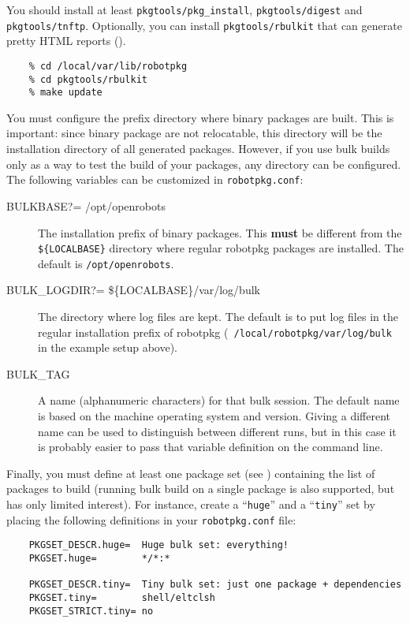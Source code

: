 You should install at least {\tt pkgtools/pkg\_install}, {\tt pkgtools/digest}
and {\tt pkgtools/tnftp}. Optionally, you can install {\tt pkgtools/rbulkit}
that can generate pretty HTML reports
().
\begin{verbatim}
	% cd /local/var/lib/robotpkg
	% cd pkgtools/rbulkit
	% make update
\end{verbatim}

You must configure the prefix  directory where binary packages are built.  This
is important: since binary package  are not relocatable, this directory will be
the installation directory of all  generated packages. However, if you use bulk
builds only as a  way to test the build of your  packages, any directory can be
configured. The following variables can be customized in {\tt robotpkg.conf}:

\begin{description}

   \item[BULKBASE?=	/opt/openrobots]
   The installation prefix of binary packages. This {\bf must} be different
   from the {\tt\$\{LOCALBASE\}} directory where regular robotpkg packages are
   installed. The default is {\tt /opt/openrobots}.

   \smallskip
   \item[BULK\_LOGDIR?=	\$\{LOCALBASE\}/var/log/bulk]
   The directory where log files are kept. The default is to put log files in
   the regular installation prefix of robotpkg ({\tt
   /local/robotpkg/var/log/bulk} in the example setup above).

   \smallskip \item[BULK\_TAG]
   A name (alphanumeric characters) for that bulk session.  The default name is
   based on the machine operating  system and version.  Giving a different name
   can be  used to distinguish between different  runs, but in this  case it is
   probably easier to pass that variable definition on the command line.

\end{description}

Finally,    you    must   define    at    least    one    package   set    (see
)
containing  the list  of packages  to  build (running  bulk build  on a  single
package is also supported, but has only limited interest). For instance, create
a ``{\tt huge}'' and a ``{\tt tiny}'' set by placing the following definitions
in your {\tt robotpkg.conf} file:
\begin{verbatim}
	PKGSET_DESCR.huge=	Huge bulk set: everything!
	PKGSET.huge=		*/*:*

	PKGSET_DESCR.tiny=	Tiny bulk set: just one package + dependencies
	PKGSET.tiny=		shell/eltclsh
	PKGSET_STRICT.tiny=	no
\end{verbatim}


